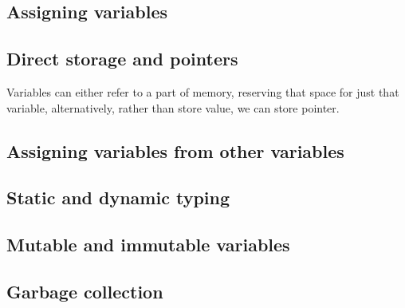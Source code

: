 




\subsection{Assigning variables}

\subsection{Direct storage and pointers}

Variables can either refer to a part of memory, reserving that space for just that variable, alternatively, rather than store value, we can store pointer.

\subsection{Assigning variables from other variables}

\subsection{Static and dynamic typing}

\subsection{Mutable and immutable variables}

\subsection{Garbage collection}

